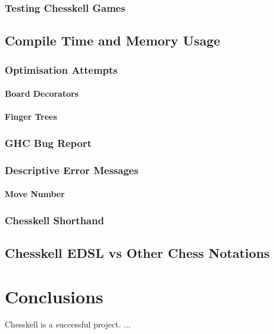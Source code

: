 \documentclass[12pt, a4paper, bibliography=totocnumbered]{scrreprt}
\begin{document}
\subsection{Testing Chesskell Games}

\section{Compile Time and Memory Usage}

\subsection{Optimisation Attempts}

\subsubsection{Board Decorators}

\subsubsection{Finger Trees}

\subsection{GHC Bug Report}

\subsection{Descriptive Error Messages}

\subsubsection{Move Number}

\subsection{Chesskell Shorthand}

\section{Chesskell EDSL vs Other Chess Notations}


\chapter{Conclusions}

Chesskell is a successful project. ...
\end{document}
